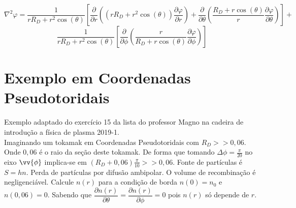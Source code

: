 \documentclass[12pt,oneside,a4paper]{abntex2}
\begin{document}
\begin{equation}
\nabla^2 \varphi = \frac{1}{r R_D + r^2 \cos(\theta)}  \left[  \dfrac{\partial}{\partial r} \left( (r R_D + r^2 \cos(\theta))\dfrac{\partial \varphi}{\partial r} \right)+\dfrac{\partial}{\partial \theta} \left( \frac{R_D + r\cos(\theta)}{r}\dfrac{\partial \varphi}{\partial \theta} \right)\right]+
\end{equation}
\begin{equation*}
\frac{1}{r R_D + r^2 \cos(\theta)}  \left[ \dfrac{\partial}{\partial \phi} \left( \frac{r}{R_D + r\cos(\theta)}\dfrac{\partial \varphi}{\partial \phi} \right)  \right]
\end{equation*}

\section{Exemplo em Coordenadas Pseudotoridais}

Exemplo adaptado do exercício 15 da lista do professor Magno na cadeira de introdução a física de plasma 2019-1.\\
Imaginando um tokamak em Coordenadas Pseudotoridais com $R_D >>0,06$. Onde $0,06$ é o raio da seção deste tokamak. De forma que tomando $\Delta \phi=\frac{\pi}{20}$ no eixo $\vv{\phi}$ implica-se em $(R_D+0,06)\frac{\pi}{10} >> 0,06$. Fonte de partículas é $S=hn$. Perda de partículas por difusão ambipolar. O volume de recombinação é negligenciável. Calcule $n(r)$ para a condição de borda $n(0)=n_0$ e $n(0,06)=0$. Sabendo que $\dfrac{\partial n(r)}{\partial \theta} = \dfrac{\partial n(r)}{\partial \phi}=0$ pois $n(r)$ só depende de $r$.
\end{document}
